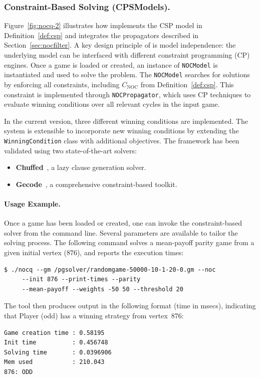 \documentclass[runningheads]{llncs}
\begin{document}
\subsubsection*{Constraint-Based Solving (CPSModels).}

Figure~\ref{fig:nocq-2} illustrates how \nocq implements the CSP model in Definition~\ref{def:csp} and integrates the \noc propagators described in Section~\ref{sec:nocfilter}. A key design principle of \nocq is model independence: the underlying model can be interfaced with different constraint programming (CP) engines.
%
Once a game is loaded or created, an instance of \texttt{NOCModel} is instantiated and used to solve the problem. The \texttt{NOCModel} searches for solutions by enforcing all constraints, including $C_{\text{NOC}}$ from Definition~\ref{def:csp}. This constraint is implemented through \texttt{NOCPropagator}, which uses CP techniques to evaluate winning conditions over all relevant cycles in the input game.

In the current version, three different winning conditions are implemented. The system is extensible to incorporate new winning conditions by extending the \texttt{WinningCondition} class with additional objectives. The framework has been validated using two state-of-the-art solvers:

\begin{itemize}
    \item \textbf{Chuffed}~\cite{chuffed:2018}, a lazy clause generation solver.
    \item \textbf{Gecode}~\cite{Gecode:2019}, a comprehensive constraint-based toolkit.
\end{itemize}

\paragraph{Usage Example.}
Once a game has been loaded or created, one can invoke the constraint-based solver from the command line. Several parameters are available to tailor the solving process. The following command solves a mean-payoff parity game from a given initial vertex (876), and reports the execution times:

\begin{lstlisting}
$ ./nocq --gm /pgsolver/randomgame-50000-10-1-20-0.gm --noc
     --init 876 --print-times --parity
     --mean-payoff --weights -50 50 --threshold 20
\end{lstlisting}

\noindent The tool then produces output in the following format (time in msecs), indicating that Player \odd (odd) has a winning strategy from vertex~876:
\begin{lstlisting}
Game creation time : 0.58195
Init time          : 0.456748
Solving time       : 0.0396906
Mem used           : 210.043
876: ODD
\end{lstlisting}
\end{document}
